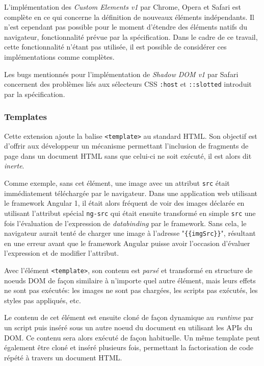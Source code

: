 L'implémentation des \emph{Custom Elements v1} par Chrome, Opera et Safari est complète en ce qui concerne la définition de nouveaux éléments indépendants. Il n'est cependant pas possible pour le moment d'étendre des éléments natifs du navigateur, fonctionnalité prévue par la spécification. Dans le cadre de ce travail, cette fonctionnalité n'étant pas utilisée, il est possible de considérer ces implémentations comme complètes.

Les bugs mentionnés pour l'implémentation de \emph{Shadow DOM v1} par Safari concernent des problèmes liés aux sélecteurs CSS \texttt{:host} et \texttt{::slotted} introduit par la spécification.

\subsubsection{Templates}

Cette extension ajoute la balise \texttt{<template>} au standard HTML. Son objectif est d'offrir aux développeur un mécanisme permettant l'inclusion de fragments de page dans un document HTML sans que celui-ci ne soit exécuté, il est alors dit \emph{inerte}.

Comme exemple, sans cet élément, une image avec un attribut \texttt{src} était immédiatement téléchargée par le navigateur. Dans une application web utilisant le framework Angular 1, il était alors fréquent de voir des images déclarée en utilisant l'attribut spécial \texttt{ng-src} qui était ensuite transformé en simple \texttt{src} une fois l'évaluation de l'expression de \emph{databinding} par le framework. Sans cela, le navigateur aurait tenté de charger une image à l'adresse "\texttt{\{\{imgSrc\}\}}", résultant en une erreur avant que le framework Angular puisse avoir l'occasion d'évaluer l'expression et de modifier l'attribut.

Avec l'élément \texttt{<template>}, son contenu est \emph{parsé} et transformé en structure de noeuds DOM de façon similaire à n'importe quel autre élément, mais leurs effets ne sont pas exécutés: les images ne sont pas chargées, les scripts pas exécutés, les styles pas appliqués, etc.

Le contenu de cet élément est ensuite cloné de façon dynamique au \emph{runtime} par un script puis inséré sous un autre noeud du document en utilisant les APIs du DOM. Ce contenu sera alors exécuté de façon habituelle. Un même template peut également être cloné et inséré plusieurs fois, permettant la factorisation de code répété à travers un document HTML.

